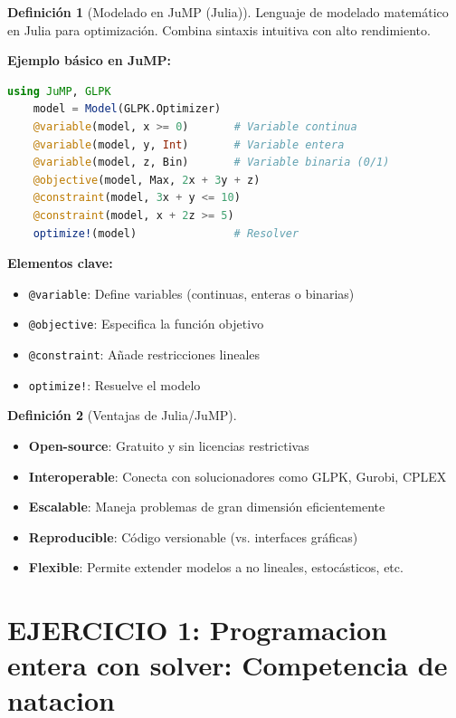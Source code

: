 \documentclass[12pt, a4paper, oneside]{book}
\theoremstyle{definition}
\newtheorem{definicion}{Definición}[chapter]
\begin{document}
    \begin{definicion}[Modelado en JuMP (Julia)]
    Lenguaje de modelado matemático en Julia para optimización. Combina sintaxis intuitiva con alto rendimiento.

    \textbf{Ejemplo básico en JuMP:}
    \begin{lstlisting}[language=Julia]
    using JuMP, GLPK
    model = Model(GLPK.Optimizer)
    @variable(model, x >= 0)       # Variable continua
    @variable(model, y, Int)       # Variable entera
    @variable(model, z, Bin)       # Variable binaria (0/1)
    @objective(model, Max, 2x + 3y + z)
    @constraint(model, 3x + y <= 10)
    @constraint(model, x + 2z >= 5)
    optimize!(model)               # Resolver
    \end{lstlisting}

    \textbf{Elementos clave:}
    \begin{itemize}[leftmargin=*]
    \item \texttt{@variable}: Define variables (continuas, enteras o binarias)
    \item \texttt{@objective}: Especifica la función objetivo
    \item \texttt{@constraint}: Añade restricciones lineales
    \item \texttt{optimize!}: Resuelve el modelo
    \end{itemize}
    \end{definicion}

    \begin{definicion}[Ventajas de Julia/JuMP]
    \begin{itemize}[leftmargin=*]
    \item \textbf{Open-source}: Gratuito y sin licencias restrictivas
    \item \textbf{Interoperable}: Conecta con solucionadores como GLPK, Gurobi, CPLEX
    \item \textbf{Escalable}: Maneja problemas de gran dimensión eficientemente
    \item \textbf{Reproducible}: Código versionable (vs. interfaces gráficas)
    \item \textbf{Flexible}: Permite extender modelos a no lineales, estocásticos, etc.
    \end{itemize}
    \end{definicion}

    \section{EJERCICIO 1: Programacion entera con solver: Competencia de natacion}
\end{document}
